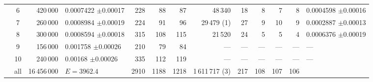 \begin{tabular}{@{}ccrlrrrrrrrrl@{}}
 & 6 & 420\,000 & 0.0007422 {\tiny$\pm$0.00017} & 228 & 88 & 87 & 48\,340 & 18 & 8 & 7 & 8 & 0.0004598 {\tiny$\pm$0.00016} \\
 & 7 & 260\,000 & 0.0008984 {\tiny$\pm$0.00019} & 224 & 91 & 96 & 29\,479 (1) & 27 & 9 & 10 & 9 & 0.0002887 {\tiny$\pm$0.00013} \\
 & 8 & 300\,000 & 0.0008594 {\tiny$\pm$0.00018} & 315 & 108 & 115 & 21\,520 & 24 & 5 & 5 & 4 & 0.0006376 {\tiny$\pm$0.00019} \\
 & 9 & 156\,000 & 0.001758 {\tiny$\pm$0.00026} & 210 & 79 & 84 & --- & --- & --- & --- & --- & --- \\
 & 10 & 240\,000 & 0.00168 {\tiny$\pm$0.00026} & 335 & 112 & 119 & --- & --- & --- & --- & --- & --- \\
 & all & 16\,456\,000 & $E=3962.4$ & 2910 & 1188 & 1218 & 1\,611\,717 (3) & 217 & 108 & 107 & 106 &  \\
\bottomrule
\end{tabular}
